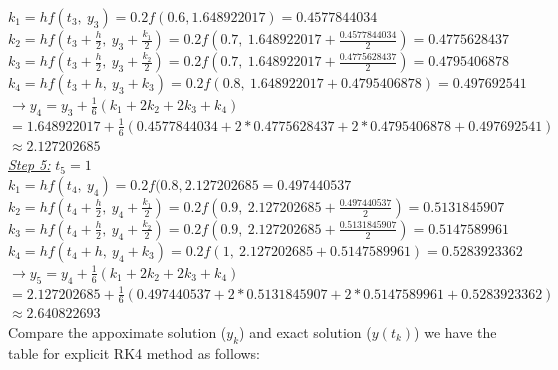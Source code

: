 \documentclass[a4paper]{article}
\numberwithin{equation}{section}
\begin{document}
  $k_1 = hf(t_3,~ y_3) = 0.2f(0.6,1.648922017) = 0.4577844034$\\
  
  $k_2 = hf\left(t_3 + \frac{h}{2},~ y_3 + \frac{k_1}{2}\right) = 0.2f(0.7,~ 1.648922017 + \frac{0.4577844034}{2}) = 0.4775628437$\\
  
  $k_3 = hf\left(t_3 + \frac{h}{2},~ y_3 + \frac{k_2}{2}\right) = 0.2f(0.7,~ 1.648922017 + \frac{0.4775628437}{2}) = 0.4795406878$\\
  
  $k_4 = hf(t_3 + h,~ y_3 + k_3) = 0.2f(0.8,~ 1.648922017+0.4795406878) = 0.497692541$\\
  
  $\rightarrow y_4 = y_3 + \frac{1}{6}(k_1 + 2k_2 + 2k_3 + k_4)$\\ 
  
  $= 1.648922017 + \frac{1}{6} \left(0.4577844034 + 2*0.4775628437 + 2*0.4795406878 + 0.497692541\right)$\\  
  
  $\approx 2.127202685$\\

\underline{\textit{Step 5:}} \(t_5=1\)\\

  $k_1 = hf(t_4,~ y_4) = 0.2f(0.8,2.127202685 = 0.497440537$\\
  
  $k_2 = hf\left(t_4 + \frac{h}{2},~ y_4 + \frac{k_1}{2}\right) = 0.2f(0.9,~ 2.127202685 + \frac{0.497440537}{2}) = 0.5131845907$\\
  
  $k_3 = hf\left(t_4 + \frac{h}{2},~ y_4 + \frac{k_2}{2}\right) = 0.2f(0.9,~ 2.127202685 + \frac{0.5131845907}{2}) = 0.5147589961$\\
  
  $k_4 = hf(t_4 + h,~ y_4 + k_3) = 0.2f(1,~ 2.127202685 + 0.5147589961) = 0.5283923362$\\
  
  $\rightarrow y_5 = y_4 + \frac{1}{6}(k_1 + 2k_2 + 2k_3 + k_4)$\\
  
  $= 2.127202685 + \frac{1}{6} \left(0.497440537 + 2*0.5131845907 + 2*0.5147589961 + 0.5283923362\right)$\\ 
  
  $\approx 2.640822693$\\

 Compare the appoximate solution (\(y_k\)) and exact solution (\(y(t_k)\)) we have the  table for explicit RK4 method as follows:
\end{document}
